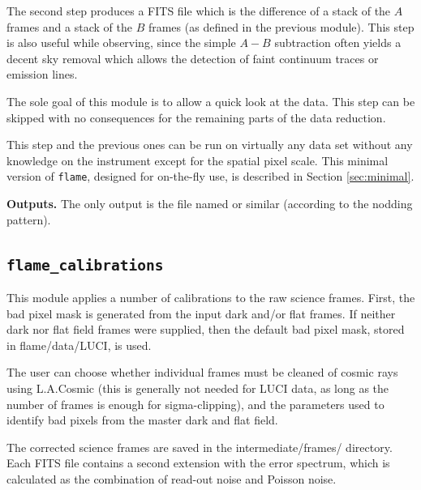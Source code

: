 \documentclass[a4paper]{article}
\newcommand{\flame}{\texttt{flame}}
\begin{document}
The second step produces a FITS file which is the difference of a stack of the $A$ frames and a stack of the $B$ frames (as defined in the previous module). This step is also useful while observing, since the simple $A-B$ subtraction often yields a decent sky removal which allows the detection of faint continuum traces or emission lines.

The sole goal of this module is to allow a quick look at the data. This step can be skipped with no consequences for the remaining parts of the data reduction.

This step and the previous ones can be run on virtually any data set without any knowledge on the instrument except for the spatial pixel scale. This minimal version of \flame, designed for on-the-fly use, is described in Section \ref{sec:minimal}.

\medskip
\noindent
\textbf{Outputs.} The only output is the file named  or similar (according to the nodding pattern).


\subsection{\texttt{flame\_calibrations}}

This module applies a number of calibrations to the raw science frames. First, the bad pixel mask is generated from the input dark and/or flat frames. If neither dark nor flat field frames were supplied, then the default bad pixel mask, stored in flame/data/LUCI, is used.

The user can choose whether individual frames must be cleaned of cosmic rays using L.A.Cosmic (this is generally not needed for LUCI data, as long as the number of frames is enough for sigma-clipping), and the parameters used to identify bad pixels from the master dark and flat field.

The corrected science frames are saved in the intermediate/frames/ directory. Each FITS file contains a second extension with the error spectrum, which is calculated as the combination of read-out noise and Poisson noise.
\end{document}
